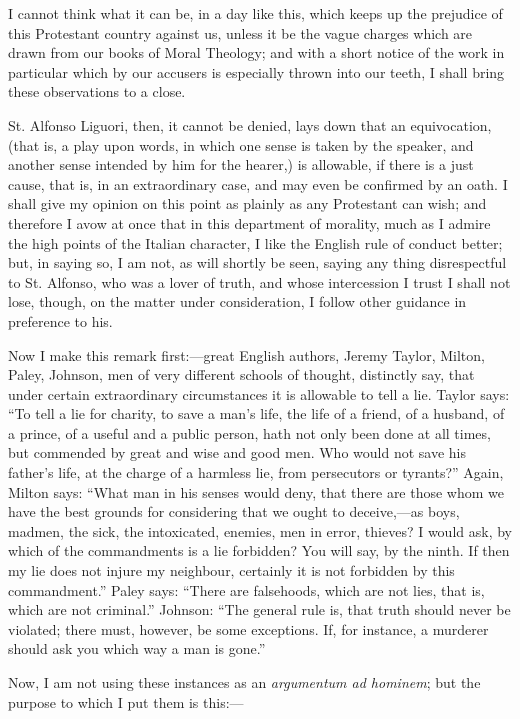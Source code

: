 I cannot think what it can be, in a day like this, which keeps up the
prejudice of this Protestant country against us, unless it be the vague
charges which are drawn from our books of Moral Theology; and with a short notice of the work in particular which
by our accusers is especially thrown into our teeth, I shall bring these observations to a close.

St. Alfonso Liguori, then, it cannot be denied, lays down
that an equivocation, (that is, a play upon words, in which one sense is
taken by the speaker, and another sense intended by him for the hearer,) is allowable, if there is a just cause, that is, in an
extraordinary case, and may even be confirmed by an oath. I shall
give my opinion on this point as plainly as any Protestant can wish; and
therefore I avow at once that in this department of morality, much as I
admire the high points of the Italian character, I like the English rule
of conduct better; but, in saying so, I am not, as will shortly be seen, saying any thing disrespectful to St. Alfonso,
who was a lover of truth, and whose intercession I trust I shall not
lose, though, on the matter under consideration, I follow other guidance
in preference to his.

Now I make this remark first:—great English authors, Jeremy
Taylor, Milton, Paley, Johnson, men of very different schools
of thought, distinctly say, that under certain extraordinary
circumstances it is allowable to tell a lie. Taylor says: ``To tell
a lie for charity, to save a man's life, the life of a friend, of a
husband, of a prince, of a useful and a public person, hath not only
been done at all times, but commended by great and wise and good men.
Who would not save his father's life, at the charge of a harmless lie,
from persecutors or tyrants?'' Again, Milton says: ``What man in
his senses would deny, that there are those whom we have the best
grounds for considering that we ought to deceive,—as boys, madmen, the
sick, the intoxicated, enemies, men in error, thieves? I would ask, by
which of the commandments is a lie forbidden? You will say, by the
ninth. If then my lie does not injure my neighbour, certainly it is not
forbidden by this commandment.'' Paley says: ``There are
falsehoods, which are not lies, that is, which are not criminal.''
Johnson: ``The general rule is, that truth should never be violated;
there must, however, be some exceptions. If, for instance, a murderer
should ask you which way a man is gone.''

Now, I am not using these instances as an \emph{argumentum ad hominem};
but the purpose to which I put them is this:—

